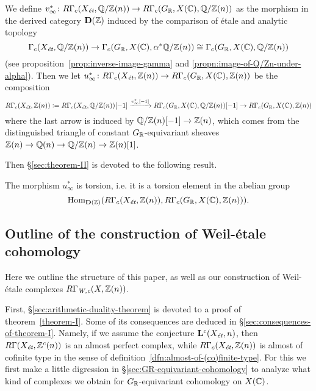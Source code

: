 \documentclass{article}
\numberwithin{equation}{section}
\begin{document}
\begin{definition}
  \label{dfn:u-infty}
  We define
  $v_\infty^*\colon R\Gamma_c (X_\et, \QQ/\ZZ (n)) \to R\Gamma_c (G_\RR, X (\CC), \QQ/\ZZ (n))$
  as the morphism in the derived category $\mathbf{D} (\ZZ)$ induced by the
  comparison of étale and analytic topology
  \[ \Gamma_c (X_\et, \QQ/\ZZ (n)) \to
  \Gamma_c (G_\RR, X (\CC), \alpha^* \QQ/\ZZ (n)) \cong
  \Gamma_c (G_\RR, X (\CC), \QQ/\ZZ (n)) \]
  (see proposition~\ref{prop:inverse-image-gamma} and
  \ref{propn:image-of-Q/Zn-under-alpha}). Then we let
  $u_\infty^*\colon R\Gamma_c (X_\et, \ZZ(n)) \to R\Gamma_c (G_\RR, X (\CC), \ZZ (n))$
  be the composition
  \[ R\Gamma_c (X_\et, \ZZ(n)) \dfn R\Gamma_c (X_\et, \QQ/\ZZ (n)) [-1]
  \xrightarrow{v_\infty^* [-1]} R\Gamma_c (G_\RR, X (\CC), \QQ/\ZZ (n)) [-1] \to
  R\Gamma_c (G_\RR, X (\CC), \ZZ (n)) \]
  where the last arrow is induced by $\QQ/\ZZ (n) [-1] \to \ZZ (n)$, which comes
  from the distinguished triangle of constant $G_\RR$-equivariant sheaves
  $\ZZ (n) \to \QQ (n) \to \QQ/\ZZ (n) \to \ZZ (n) [1]$.
\end{definition}

Then \S\ref{sec:theorem-II} is devoted to the following result.

\begin{maintheorem}
  \label{theorem-II}
  The morphism $u_\infty^*$ is torsion, i.e. it is a torsion element in the
  abelian group
  $$\Hom_{\mathbf{D} (\ZZ)} (R\Gamma_c (X_\et, \ZZ(n)), R\Gamma_c (G_\RR, X (\CC), \ZZ(n))).$$
\end{maintheorem}

\subsection*{Outline of the construction of Weil-étale cohomology}

Here we outline the structure of this paper, as well as our construction of
Weil-étale complexes $R\Gamma_\Wc (X, \ZZ (n))$.

First, \S\ref{sec:arithmetic-duality-theorem} is devoted to a proof of
theorem~\ref{theorem-I}. Some of its consequences are deduced in
\S\ref{sec:consequences-of-theorem-I}. Namely, if we assume the conjecture
$\mathbf{L}^c (X_\et, n)$, then $R\Gamma (X_\et, \ZZ^c (n))$ is an almost
perfect complex, while $R\Gamma_c (X_\et, \ZZ (n))$ is almost of cofinite type
in the sense of definition~\ref{dfn:almost-of-(co)finite-type}. For this we
first make a little digression in \S\ref{sec:GR-equivariant-cohomology} to
analyze what kind of complexes we obtain for $G_\RR$-equivariant cohomology on
$X (\CC)$.
\end{document}
